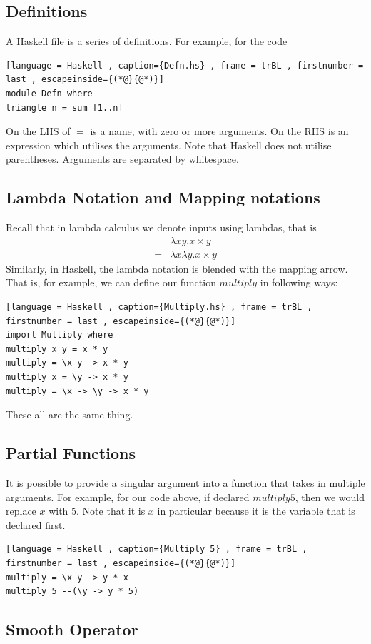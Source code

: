 \documentclass[a4paper]{article}
\theoremstyle{plain}
\theoremstyle{definition}
\theoremstyle{remark}
\begin{document}
\subsection{Definitions}
A Haskell file is a series of definitions. For example, for the code
\begin{lstlisting}[language = Haskell , caption={Defn.hs} , frame = trBL , firstnumber = last , escapeinside={(*@}{@*)}]
module Defn where
triangle n = sum [1..n]
\end{lstlisting}
On the LHS of $=$ is a name, with zero or more arguments. On the RHS is an expression which utilises the arguments. Note that Haskell does not utilise parentheses. Arguments are separated by whitespace.
\subsection{Lambda Notation and Mapping notations}
Recall that in lambda calculus we denote inputs using lambdas, that is
\begin{align*}
	&\lambda x y . x \times y \\
	=& \lambda x \lambda y . x \times y 
\end{align*}
Similarly, in Haskell, the lambda notation is blended with the mapping arrow. That is, for example, we can define our function $multiply$ in following ways:
\begin{lstlisting}[language = Haskell , caption={Multiply.hs} , frame = trBL , firstnumber = last , escapeinside={(*@}{@*)}]
import Multiply where
multiply x y = x * y
multiply = \x y -> x * y
multiply x = \y -> x * y
multiply = \x -> \y -> x * y
\end{lstlisting}
These all are the same thing.
\subsection{Partial Functions}
It is possible to provide a singular argument into a function that takes in multiple arguments. For example, for our code above, if declared $multiply 5$, then we would replace $x$ with $5$. Note that it is $x$ in particular because it is the variable that is declared first. 
\begin{lstlisting}[language = Haskell , caption={Multiply 5} , frame = trBL , firstnumber = last , escapeinside={(*@}{@*)}]
multiply = \x y -> y * x
multiply 5 --(\y -> y * 5)
\end{lstlisting}
\subsection{Smooth Operator}
\end{document}
